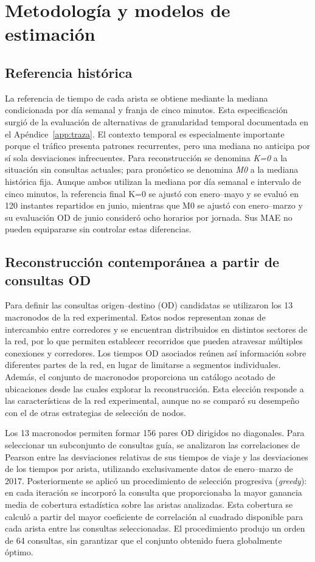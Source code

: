 \documentclass[letterpaper,11pt]{article}
\begin{document}
\section{Metodología y modelos de estimación}
\subsection{Referencia histórica}
La referencia de tiempo de cada arista se obtiene mediante la mediana condicionada por día semanal y franja de cinco minutos. Esta especificación surgió de la evaluación de alternativas de granularidad temporal documentada en el Apéndice~\ref{app:traza}. El contexto temporal es especialmente importante porque el tráfico presenta patrones recurrentes, pero una mediana no anticipa por sí sola desviaciones infrecuentes. Para reconstrucción se denomina \emph{K=0} a la situación sin consultas actuales; para pronóstico se denomina \emph{M0} a la mediana histórica fija. Aunque ambos utilizan la mediana por día semanal e intervalo de cinco minutos, la referencia final K=0 se ajustó con enero--mayo y se evaluó en 120 instantes repartidos en junio, mientras que M0 se ajustó con enero--marzo y su evaluación OD de junio consideró ocho horarios por jornada. Sus MAE no pueden equipararse sin controlar estas diferencias.

\subsection{Reconstrucción contemporánea a partir de consultas OD}

Para definir las consultas origen--destino (OD) candidatas se utilizaron los 13 macronodos de la red experimental. Estos nodos representan zonas de intercambio entre corredores y se encuentran distribuidos en distintos sectores de la red, por lo que permiten establecer recorridos que pueden atravesar múltiples conexiones y corredores. Los tiempos OD asociados reúnen así información sobre diferentes partes de la red, en lugar de limitarse a segmentos individuales. Además, el conjunto de macronodos proporciona un catálogo acotado de ubicaciones desde las cuales explorar la reconstrucción. Esta elección responde a las características de la red experimental, aunque no se comparó su desempeño con el de otras estrategias de selección de nodos.

Los 13 macronodos permiten formar 156 pares OD dirigidos no diagonales. Para seleccionar un subconjunto de consultas guía, se analizaron las correlaciones de Pearson entre las desviaciones relativas de sus tiempos de viaje y las desviaciones de los tiempos por arista, utilizando exclusivamente datos de enero--marzo de 2017. Posteriormente se aplicó un procedimiento de selección progresiva (\emph{greedy}): en cada iteración se incorporó la consulta que proporcionaba la mayor ganancia media de cobertura estadística sobre las aristas analizadas. Esta cobertura se calculó a partir del mayor coeficiente de correlación al cuadrado disponible para cada arista entre las consultas seleccionadas. El procedimiento produjo un orden de 64 consultas, sin garantizar que el conjunto obtenido fuera globalmente óptimo.
\end{document}
